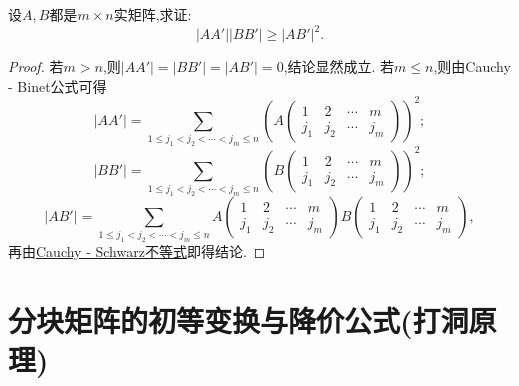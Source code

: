 \documentclass[lang=cn,newtx,10pt,scheme=chinese]{elegantbook}
\begin{document}
\begin{example}
设\(A,B\)都是\(m\times n\)实矩阵,求证:
\[
|AA'||BB'|\geq|AB'|^2.
\]
\end{example}
\begin{proof}
若\(m > n\),则\(|AA'| = |BB'| = |AB'| = 0\),结论显然成立.
若\(m\leq n\),则由Cauchy - Binet公式可得
\[
|AA'|=\sum_{1\leq j_1<j_2<\cdots<j_m\leq n}\left(A\begin{pmatrix}
1 & 2 & \cdots & m\\
j_1 & j_2 & \cdots & j_m
\end{pmatrix}\right)^2;
\]
\[
|BB'|=\sum_{1\leq j_1<j_2<\cdots<j_m\leq n}\left(B\begin{pmatrix}
1 & 2 & \cdots & m\\
j_1 & j_2 & \cdots & j_m
\end{pmatrix}\right)^2;
\]
\[
|AB'|=\sum_{1\leq j_1<j_2<\cdots<j_m\leq n}A\begin{pmatrix}
1 & 2 & \cdots & m\\
j_1 & j_2 & \cdots & j_m
\end{pmatrix}B\begin{pmatrix}
1 & 2 & \cdots & m\\
j_1 & j_2 & \cdots & j_m
\end{pmatrix},
\]
再由\hyperref[theorem:Cauchy - Schwarz不等式]{Cauchy - Schwarz不等式}即得结论.
\end{proof}

\section{分块矩阵的初等变换与降价公式(打洞原理)}
\end{document}
